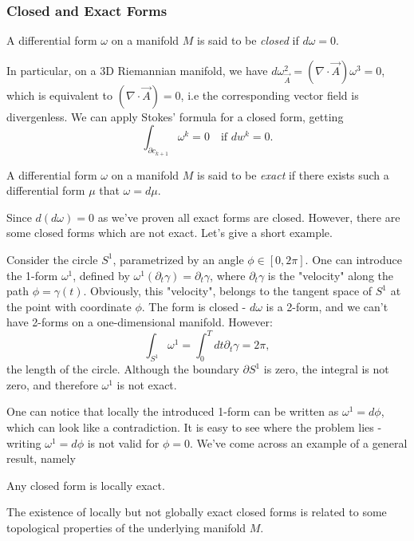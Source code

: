 \subsubsection{Closed and Exact Forms}
\begin{definition}
  A differential form $\omega$ on a manifold $M$ is said to be \textit{closed}
  if $d\omega = 0.$
\end{definition}
In particular, on a 3D Riemannian manifold, we have $d\omega^2_{\vec{A}}
= \left(\nabla\cdot\vec{A}\right)\omega^3 = 0$, which is equivalent to
$\left(\nabla\cdot\vec{A}\right) = 0$, i.e the corresponding vector field is
divergenless. We can apply Stokes' formula for a closed form, getting
\begin{equation}
  \int_{\partial c_{k+1}}{\omega^k} = 0\quad\text{if }dw^k=0.
  \label{eq:stokesclosedform}
\end{equation}
\begin{definition}
  A  differential form $\omega$ on a manifold $M$ is said to be \textit{exact}
  if there exists such a differential form $\mu$ that $\omega = d\mu$.
\end{definition}
Since $d(d\omega) = 0$ as we've proven all exact forms are closed. However,
there are some closed forms which are not exact. Let's give a short example.
\begin{example}
  Consider the circle $S^1$, parametrized by an angle $\phi\in [0,2\pi]$. One
  can introduce the 1-form $\omega^1$, defined by
  $\omega^1(\partial_t\gamma)=\partial_t\gamma$, where $\partial_t\gamma$ is
  the "velocity" along the path $\phi = \gamma(t)$. Obviously, this "velocity",
  belongs to the tangent space of $S^1$ at the point with coordinate $\phi$.
  The form is closed - $d\omega$ is a 2-form, and we can't have 2-forms on
  a one-dimensional manifold. However:
  \begin{equation}
    \int_{S^1}\omega^1 = \int_{0}^T{dt \partial_t\gamma} = 2\pi,
  \end{equation}
the length of the circle. Although the boundary $\partial S^1$ is zero, the
integral is not zero, and therefore $\omega^1$ is not exact.
\end{example}
\par One can notice that locally the introduced 1-form can be written as
$\omega^1 = d\phi$, which can look like a contradiction. It is easy to see
where the problem lies - writing $\omega^1 = d\phi$ is not valid for $\phi=0$.
We've come across an example of a general result, namely
\begin{theorem}
  Any closed form is locally exact.
\end{theorem}
The existence of locally but not globally exact closed forms is related to some
topological properties of the underlying manifold $M$.

